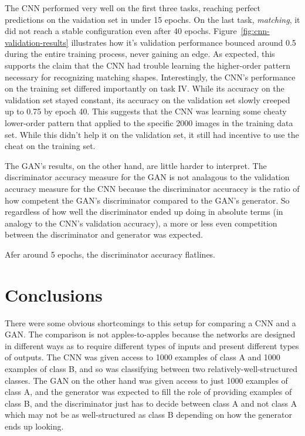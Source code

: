 \documentclass{article}
\renewcommand{\it}{\textit}
\begin{document}
The CNN performed very well on the first three tasks, reaching perfect predictions on the vaidation set in under 15 epochs.
On the last task, \it{matching}, it did not reach a stable configuration even after 40 epochs.
Figure~\ref{fig:cnn-validation-results} illustrates how it's validation performance bounced around 0.5 during the entire training process, never gaining an edge.
As expected, this supports the claim that the CNN had trouble learning the higher-order pattern necessary for recognizing matching shapes.
Interestingly, the CNN's performance on the training set differed importantly on task IV.
While its accuracy on the validation set stayed constant, its accuracy on the validation set slowly creeped up to 0.75 by epoch 40.
This suggests that the CNN was learning some cheaty lower-order pattern that applied to the specific 2000 images in the training data set.
While this didn't help it on the validation set, it still had incentive to use the cheat on the training set.

The GAN's results, on the other hand, are little harder to interpret.
The discriminator accuracy measure for the GAN is not analagous to the validation accuracy measure for the CNN because the discriminator accuraccy is the ratio of how competent the GAN's discriminator compared to the GAN's generator.
So regardless of how well the discriminator ended up doing in absolute terms (in analogy to the CNN's validation accuracy), a more or less even competition between the discriminator and generator was expected.

Afer around 5 epochs, the discriminator accuracy flatlines.

\section{Conclusions}

There were some obvious shortcomings to this setup for comparing a CNN and a GAN.
The comparison is not apples-to-apples because the networks are designed in different ways as to require different types of inputs and present different types of outputs.
The CNN was given access to 1000 examples of class A and 1000 examples of class B, and so was classifying between two relatively-well-structured classes.
The GAN on the other hand was given access to just 1000 examples of class A, and the generator was expected to fill the role of providing examples of class B, and the discriminator just has to decide between class A and not class A which may not be as well-structured as class B depending on how the generator ends up looking.
\end{document}
